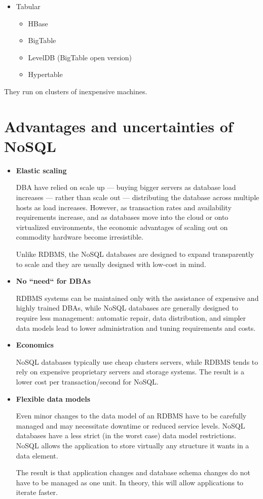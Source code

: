 \begin{itemize}
\item Tabular

  \begin{itemize}
    \item HBase
    \item BigTable
    \item LevelDB (BigTable open version)
    \item Hypertable
  \end{itemize}
  

\end{itemize}

They run on clusters of inexpensive machines.




\section{Advantages and uncertainties of NoSQL}

\begin{itemize}

\item \textbf{Elastic scaling}

DBA have relied on scale up — buying bigger servers as database load increases — rather than scale out — distributing the database across multiple hosts as load increases. However, as transaction rates and availability requirements increase, and as databases move into the cloud or onto virtualized environments, the economic advantages of scaling out on commodity hardware become irresistible.

Unlike RDBMS, the NoSQL databases are designed to expand transparently to scale and they are usually designed with low-cost in mind.


\item \textbf{No ``need`` for DBAs}

RDBMS systems can be maintained only with the assistance of expensive and highly trained DBAs, while NoSQL databases are generally designed to require less management:  automatic repair, data distribution, and simpler data models lead to lower administration and tuning requirements and costs.


\item \textbf{Economics}

NoSQL databases typically use cheap clusters servers, while RDBMS tends to rely on expensive proprietary servers and storage systems. The result is a lower cost per transaction/second for NoSQL.


\item \textbf{Flexible data models}

Even minor changes to the data model of an RDBMS have to be carefully managed and may necessitate downtime or reduced service levels. NoSQL databases have a less strict (in the worst case) data model restrictions. NoSQL allows the application to store virtually any structure it wants in a data element.

The result is that application changes and database schema changes do not have to be managed as one unit. In theory, this will allow applications to iterate faster.

\end{itemize}


